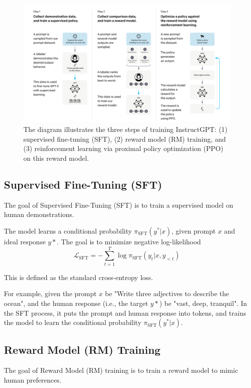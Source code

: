 \documentclass{article} %
\begin{document}
\begin{figure}[H]
    \centering
    \includegraphics[width=1\linewidth]{InstructGPT.png}
    \caption{The diagram illustrates the three steps of training InstructGPT: (1) supervised ﬁne-tuning (SFT), (2) reward model (RM) training, and (3) reinforcement learning via proximal policy optimization (PPO) on this reward model. }
    \label{fig:enter-label}
\end{figure}

\subsection{Supervised Fine-Tuning (SFT)}
The goal of Supervised Fine-Tuning (SFT) is to train a supervised model on human demonstrations.

The model learns a conditional probability \( \pi_{\text{SFT}}(y^*|x) \), given prompt \(x\) and ideal response \(y*\). The goal is to minimize negative log-likelihood
\[
\mathcal{L}_{\text{SFT}} = -\sum_{t=1}^{T} \log \pi_{\text{SFT}}(y_t | x, y_{<t})
\]

This is defined as the standard cross-entropy loss.

For example, given the prompt \(x\) be "Write three adjectives to describe the ocean", and the human response (i.e., the target \(y*\)) be "vast, deep, tranquil". In the SFT process, it puts the prompt and human response into tokens, and trains the model to learn the conditional probability \( \pi_{\text{SFT}}(y^*|x) \).

   
\subsection{Reward Model (RM) Training}
The goal of Reward Model (RM) training is to train a reward model to mimic human preferences. 
\end{document}
